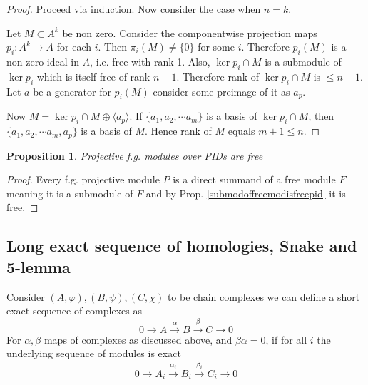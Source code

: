 \documentclass[12pt]{article}
\numberwithin{equation}{section}
\newcounter{dummy} \numberwithin{dummy}{section}
\newtheorem{proposition}[dummy]{Proposition}
\begin{document}
\begin{appendices}
\begin{proof}
		Proceed via induction. Now consider the case when $n=k$. 
		
		Let $M \subset A^k$ be non zero. Consider the componentwise projection maps $p_i: A^{k} \to A$ for each $i$. Then $\pi_i(M) \neq \{0\}$ for some $i$. Therefore $p_i(M)$ is a non-zero ideal in $A$, i.e. free with rank 1. Also, $\ker p_i \cap M$ is a submodule of $\ker p_i$ which is itself free of rank $n-1$. Therefore rank of $\ker p_i \cap M$ is $\leq n - 1$. Let $a$ be a generator for $p_i(M)$ consider some preimage of it as $a_p$.
		
		Now $M = \ker p_i \cap M \oplus \langle a_p \rangle$. If $\{a_1, a_2, \cdots a_m\}$ is a basis of $\ker p_i \cap M$, then $\{a_1, a_2, \cdots a_m, a_p \}$ is a basis of $M$. Hence rank of $M$ equals $m + 1 \leq n$. 
		
	\end{proof}
	
	\begin{proposition}\label{projfgpidfree}
		Projective f.g. modules over PIDs are free
	\end{proposition}
	\begin{proof}
		Every f.g. projective module $P$ is a direct summand of a free module $F$ meaning it is a submodule of $F$ and by Prop. \ref{submodoffreemodisfreepid} it is free.
	\end{proof}

	
	
	\subsection{Long exact sequence of homologies, Snake and 5-lemma}

	Consider $(A,\varphi),(B,\psi),(C,\chi)$ to be chain complexes we can define a short exact sequence of complexes as \[ 0 \to A \xrightarrow{\alpha} B \xrightarrow{\beta} C \to 0 \]
	For $\alpha, \beta $ maps of complexes as discussed above, and $\beta \alpha=0$, if for all $i$ the underlying sequence of modules is exact\[ 0 \to A_i \xrightarrow{\alpha_i } B_i \xrightarrow{\beta_i } C_i \to 0\]
	

\end{appendices}
\end{document}
